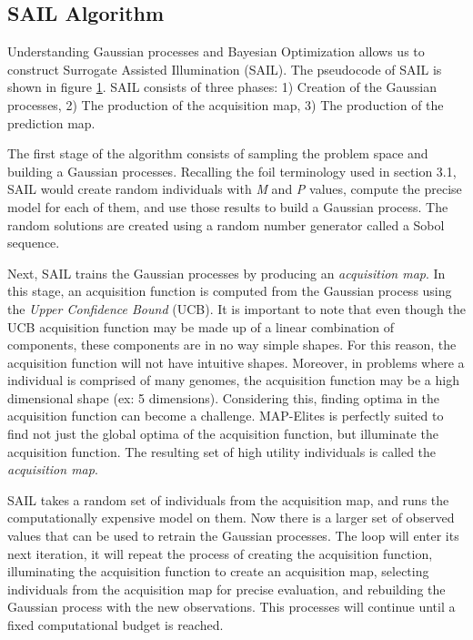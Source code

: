 \documentclass{sig-alternate}
\begin{document}
\subsection{SAIL Algorithm}
\label{SAILAlgorithm}

Understanding Gaussian processes and Bayesian Optimization allows us to construct Surrogate Assisted Illumination (SAIL).
The pseudocode of SAIL is shown in figure \ref{fig:SAILpcode}.
SAIL consists of three phases: 
1) Creation of the Gaussian processes, 
2) The production of the acquisition map, 
3) The production of the prediction map. 

\begin{figure}[htb]
\centering
{}
\label{fig:SAILpcode}
\caption{}
\end{figure}

The first stage of the algorithm consists of sampling the problem space and building a Gaussian processes.
Recalling the foil terminology used in section 3.1, SAIL would create random individuals with \textit{M} and \textit{P} values, compute the precise model for each of them, and use those results to build a Gaussian process.
The random solutions are created using a random number generator called a Sobol sequence.

Next, SAIL trains the Gaussian processes by producing an \textit{acquisition map}.
In this stage, an acquisition function is computed from the Gaussian process using the \textit{Upper Confidence Bound} (UCB).
It is important to note that even though the UCB acquisition function may be made up of a linear combination of components, these components are in no way simple shapes.
For this reason, the acquisition function will not have intuitive shapes.
Moreover, in problems where a individual is comprised of many genomes, the acquisition function may be a high dimensional shape (ex: 5 dimensions).
Considering this, finding optima in the acquisition function can become a challenge.
MAP-Elites is perfectly suited to find not just the global optima of the acquisition function, but illuminate the acquisition function.
The resulting set of high utility individuals is called the \textit{acquisition map}. 

SAIL takes a random set of individuals from the acquisition map, and runs the computationally expensive model on them.
Now there is a larger set of observed values that can be used to retrain the Gaussian processes.
The loop will enter its next iteration, it will repeat the process of creating the acquisition function, illuminating the acquisition function to create an acquisition map, selecting individuals from the acquisition map for precise evaluation, and rebuilding the Gaussian process with the new observations.
This processes will continue until a fixed computational budget is reached.
\end{document}
